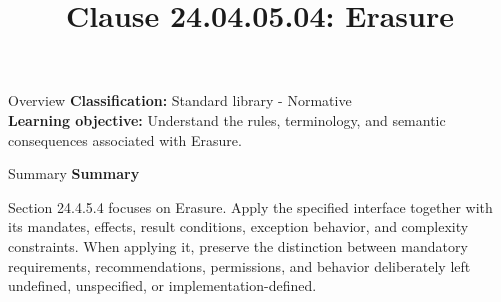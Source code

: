 \documentclass[10pt,letterpaper]{article}
\title{Clause 24.04.05.04: Erasure}
\author{}
\date{}
\begin{document}
\maketitle
\begin{CornellOverviewBox}{Overview}
\textbf{Classification:} Standard library - Normative\\[2pt]
\textbf{Learning objective:} Understand the rules, terminology, and semantic consequences associated with Erasure.
\end{CornellOverviewBox}\begin{CornellSummaryBox}{Summary}
{\sffamily\bfseries\color{Accent} Summary}\par\vspace{3pt}Section 24.4.5.4 focuses on Erasure. Apply the specified interface together with its mandates, effects, result conditions, exception behavior, and complexity constraints. When applying it, preserve the distinction between mandatory requirements, recommendations, permissions, and behavior deliberately left undefined, unspecified, or implementation-defined.
\end{CornellSummaryBox}
\end{document}

